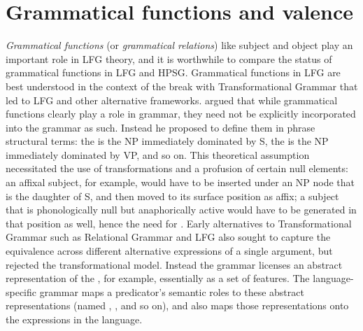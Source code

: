 \section{Grammatical functions and valence} 
\label{valence-sec}
\emph{Grammatical functions}  (or \emph{grammatical relations})  like subject and object play an important role in LFG theory,  and it is worthwhile to compare the status of grammatical functions in LFG and HPSG.  Grammatical functions in LFG are best understood in the context of the break with Transformational Grammar that led to LFG and other alternative frameworks.  \citet[68--74]{Chomsky65a} argued that while grammatical functions clearly play a role in  grammar, they need not be explicitly incorporated into the grammar as such.  Instead he proposed to define them in phrase structural terms: the  is the NP immediately dominated by S, the  is the NP immediately dominated by VP, and so on.   This theoretical
assumption necessitated the use of transformations and a
profusion of certain null elements: an affixal subject, for example,
would have to be inserted under an NP node that is the daughter of S, and then moved to its surface position as affix; a subject that is phonologically null but anaphorically active would have to be generated in that position as well, hence the need for .  Early alternatives to Transformational Grammar such as Relational Grammar \citep{Perlmutter83a-ed} and LFG also sought to  capture the equivalence
across different alternative expressions of a single argument, but
rejected the transformational model.   Instead the grammar licenses an abstract representation of the , for example, essentially as a set of features.  The language-specific grammar maps a predicator's semantic roles to these abstract representations (named , , and so on), and also maps those representations onto the expressions in the language.  

